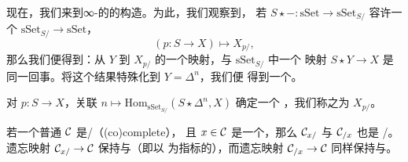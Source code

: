 现在，我们来到∞-\trCategories{}的\trSliceCategory{}的构造。为此，我们观察到，
若\trFunctor{} $S \star -\colon \mathrm{sSet} \to \mathrm{sSet}_{S/}$ 容许一个%
\trRightAdjoint{} $\mathrm{sSet}_{S/} \to \mathrm{sSet}$，
\[
(p\colon S \to X) \mapsto X_{p/},
\]
那么我们便得到：从 $Y$ 到 $X_{p/}$ 的一个映射，与 $\mathrm{sSet}_{S/}$ 中一个
映射 $S \star Y \to X$ 是同一回事。将这个结果特殊化到 $Y = \Delta^n$，我们便
得到一个\trSimplicialSet{}。

\begin{definition}\label{def:slice-simplicial-set}
对 $p\colon S \to X$，关联
$n \mapsto \mathrm{Hom}_{\mathrm{sSet}_{S/}}(S \star \Delta^n, X)$ 确定一个%
\trSimplicialSet{}，我们称之为 $X_{p/}$。
\end{definition}

\begin{lemma}\label{lem:slice-complete}
若一个普通\trCategory{} $\mathcal{C}$ 是\trComplete{}/\trCocomplete{}（(co)complete），
且 $x \in \mathcal{C}$ 是一个\trObject{}，那么 $\mathcal{C}_{x/}$ 与 $\mathcal{C}_{/x}$ 也是%
\trComplete{}/\trCocomplete{}。遗忘映射
$\mathcal{C}_{x/} \to \mathcal{C}$ 保持\trLimit{}与\trConnected{}\trColimit{}（即以%
\trConnected{}\trCategories{}为指标的\trColimit{}），而遗忘映射
$\mathcal{C}_{/x} \to \mathcal{C}$ 同样保持\trColimit{}与\trConnected{}\trLimit{}。
\end{lemma}

